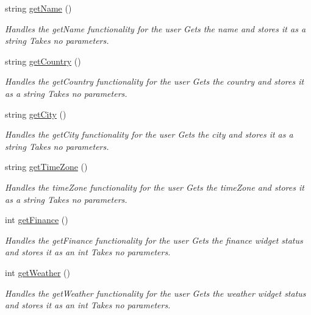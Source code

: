 \begin{DoxyCompactItemize}
string \mbox{\hyperlink{classuser_sign_in_a6b0ff4eb19a71e5f891da4c779aa2027}{get\+Name}} ()
\begin{DoxyCompactList}\small\item\em Handles the get\+Name functionality for the user  Gets the name and stores it as a string  Takes no parameters. \end{DoxyCompactList}\item 
string \mbox{\hyperlink{classuser_sign_in_a56eae654d96ddc6d8b948d3ba24bbcd9}{get\+Country}} ()
\begin{DoxyCompactList}\small\item\em Handles the get\+Country functionality for the user  Gets the country and stores it as a string  Takes no parameters. \end{DoxyCompactList}\item 
string \mbox{\hyperlink{classuser_sign_in_ac79d85051634716b43ff1cbc01df1433}{get\+City}} ()
\begin{DoxyCompactList}\small\item\em Handles the get\+City functionality for the user  Gets the city and stores it as a string  Takes no parameters. \end{DoxyCompactList}\item 
string \mbox{\hyperlink{classuser_sign_in_ae12adda30b996b9b72f1df55c93f2d2c}{get\+Time\+Zone}} ()
\begin{DoxyCompactList}\small\item\em Handles the time\+Zone functionality for the user  Gets the time\+Zone and stores it as a string  Takes no parameters. \end{DoxyCompactList}\item 
int \mbox{\hyperlink{classuser_sign_in_a12d39d46c20c4c1af66f5077166d6f24}{get\+Finance}} ()
\begin{DoxyCompactList}\small\item\em Handles the get\+Finance functionality for the user  Gets the finance widget status and stores it as an int  Takes no parameters. \end{DoxyCompactList}\item 
int \mbox{\hyperlink{classuser_sign_in_a1b7a9edee0062900153cbba2162e65da}{get\+Weather}} ()
\begin{DoxyCompactList}\small\item\em Handles the get\+Weather functionality for the user  Gets the weather widget status and stores it as an int  Takes no parameters. \end{DoxyCompactList}\item 

\end{DoxyCompactItemize}
